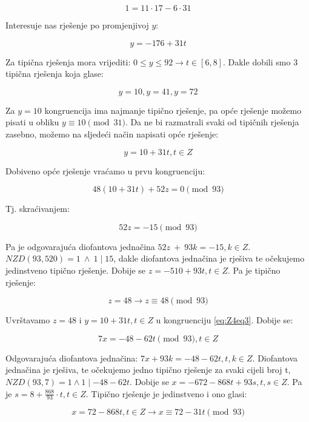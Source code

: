 \documentclass[12pt]{article}
\begin{document}
$$1 = 11 \cdot 17 - 6 \cdot 31$$\vspace{1mm}

Interesuje nas rješenje po promjenjivoj $y$:

$$y = -176 + 31t$$\vspace{1mm}

Za tipična rješenja mora vrijediti: $0 \leq y \leq 92 \to t \in [6, 8]$. Dakle dobili smo 3 tipična rješenja koja glase:

$$y = 10, y = 41, y = 72$$\vspace{1mm}

Za $y = 10$ kongruencija ima najmanje tipično rješenje, pa opće rješenje možemo pisati u obliku $y \equiv 10 \pmod{31}$. Da ne bi razmatrali svaki od tipičnih rješenja zasebno, možemo na sljedeći način napisati opće rješenje:

$$y = 10 + 31t, t \in Z$$\vspace{1mm}

Dobiveno opće rješenje vraćamo u prvu kongruenciju:

$$48(10 + 31t) + 52z = 0 \pmod {93}$$\vspace{1mm}

Tj. skraćivanjem:

$$52z = -15 \pmod{93}$$\vspace{1mm}

Pa je odgovarajuća diofantova jednačina $52z\> +\> 93k = -15, k \in Z$. $NZD(93, 520) = 1 \> \land \> 1 \mid 15$, dakle diofantova jednačina je rješiva te očekujemo jedinstveno tipično rješenje. Dobije se $z = -510 + 93t, t \in Z$. Pa je tipično rješenje:

$$z = 48 \to z \equiv 48 \pmod{93}$$\vspace{1mm}

Uvrštavamo $z = 48$ i $y = 10 + 31t, t \in Z$ u kongruenciju \ref{eq:Z4eq3}. Dobije se:

$$7x = -48 - 62t \pmod{93}, t \in Z$$\vspace{1mm}

Odgovarajuća diofantova jednačina: $7x + 93k = -48 - 62t, t, k \in Z$. Diofantova jednačina je rješiva, te očekujemo jedno tipično rješenje za svaki cijeli broj t, $NZD(93, 7) = 1 \land 1 \mid -48 - 62t$.
Dobije se $x = -672 -868t + 93s, t, s \in Z$. Pa je $s = 8 + \frac{868}{93} \cdot t, t \in Z$. Tipično rješenje je jedinstveno i ono glasi:

$$x = 72 - 868t, t \in Z \to x \equiv 72 - 31t \pmod{93}$$\vspace{1mm}
\end{document}

